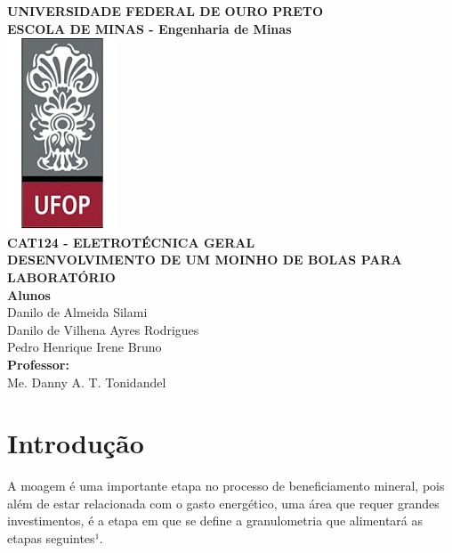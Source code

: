 \documentclass[a4paper, 12pt, brazil]{article}
\begin{document}
\onehalfspacing
\begin{titlepage}
\begin{center}
\textbf{\large UNIVERSIDADE FEDERAL DE OURO PRETO}\\[0.3cm] 
\textbf{\large ESCOLA DE MINAS - Engenharia de Minas}\\[0.2cm]
\vspace{30pt}
\includegraphics{logoufop.jpg}\\[1cm]
\vspace{20pt}
\textbf{\large CAT124 - ELETROTÉCNICA GERAL}\\
\vspace{15pt}
\myrule[1pt][7pt]
\vspace{15pt}
\textbf{\large  DESENVOLVIMENTO DE UM MOINHO DE BOLAS PARA LABORATÓRIO}\\
\vspace{15pt}
\myrule[1pt][7pt]
\vspace{45pt}
\textbf{\large Alunos}\\[0.2cm]
Danilo de Almeida Silami \\[0.1cm]
Danilo de Vilhena Ayres Rodrigues \\[0.1cm]
Pedro Henrique Irene Bruno \\ 
\vspace{45pt}
\textbf {\large Professor:}\\[0.2cm]
\Large {Me. Danny A. T. Tonidandel}\\[0.1cm]
\end{center}
\end{titlepage}
\newpage
\section{Introdução}
A moagem é uma importante etapa no processo de beneficiamento mineral, pois além de estar relacionada com o gasto energético, uma área que requer grandes investimentos, é a etapa em que se define a granulometria que alimentará as etapas seguintes¹.
\newline
\end{document}
